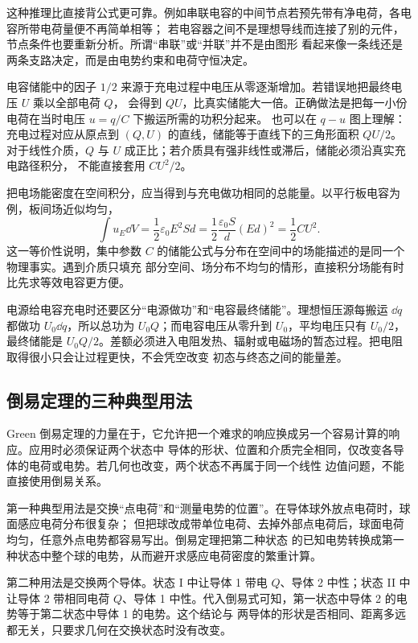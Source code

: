 这种推理比直接背公式更可靠。例如串联电容的中间节点若预先带有净电荷，各电容所带电荷量便不再简单相等；
若电容器之间不是理想导线而连接了别的元件，节点条件也要重新分析。所谓“串联”或“并联”并不是由图形
看起来像一条线还是两条支路决定，而是由电势约束和电荷守恒决定。

电容储能中的因子 $1/2$ 来源于充电过程中电压从零逐渐增加。若错误地把最终电压 $U$ 乘以全部电荷 $Q$，
会得到 $QU$，比真实储能大一倍。正确做法是把每一小份电荷在当时电压 $u=q/C$ 下搬运所需的功积分起来。
也可以在 $q-u$ 图上理解：充电过程对应从原点到 $(Q,U)$ 的直线，储能等于直线下的三角形面积
$QU/2$。对于线性介质，$Q$ 与 $U$ 成正比；若介质具有强非线性或滞后，储能必须沿真实充电路径积分，
不能直接套用 $CU^2/2$。

把电场能密度在空间积分，应当得到与充电做功相同的总能量。以平行板电容为例，板间场近似均匀，
\[
 \int u_E\dd V=\frac12\varepsilon_0E^2Sd
 =\frac12\frac{\varepsilon_0S}{d}(Ed)^2
 =\frac12CU^2.
\]
这一等价性说明，集中参数 $C$ 的储能公式与分布在空间中的场能描述的是同一个物理事实。遇到介质只填充
部分空间、场分布不均匀的情形，直接积分场能有时比先求等效电容更方便。

电源给电容充电时还要区分“电源做功”和“电容最终储能”。理想恒压源每搬运 $\dd q$ 都做功
$U_0\dd q$，所以总功为 $U_0Q$；而电容电压从零升到 $U_0$，平均电压只有 $U_0/2$，最终储能是
$U_0Q/2$。差额必须进入电阻发热、辐射或电磁场的暂态过程。把电阻取得很小只会让过程更快，不会凭空改变
初态与终态之间的能量差。

\subsection*{倒易定理的三种典型用法}

Green 倒易定理的力量在于，它允许把一个难求的响应换成另一个容易计算的响应。应用时必须保证两个状态中
导体的形状、位置和介质完全相同，仅改变各导体的电荷或电势。若几何也改变，两个状态不再属于同一个线性
边值问题，不能直接使用倒易关系。

第一种典型用法是交换“点电荷”和“测量电势的位置”。在导体球外放点电荷时，球面感应电荷分布很复杂；
但把球改成带单位电荷、去掉外部点电荷后，球面电荷均匀，任意外点电势都容易写出。倒易定理把第二种状态
的已知电势转换成第一种状态中整个球的电势，从而避开求感应电荷密度的繁重计算。

第二种用法是交换两个导体。状态 I 中让导体 1 带电 $Q$、导体 2 中性；状态 II 中让导体 2 带相同电荷
$Q$、导体 1 中性。代入倒易式可知，第一状态中导体 2 的电势等于第二状态中导体 1 的电势。这个结论与
两导体的形状是否相同、距离多远都无关，只要求几何在交换状态时没有改变。

